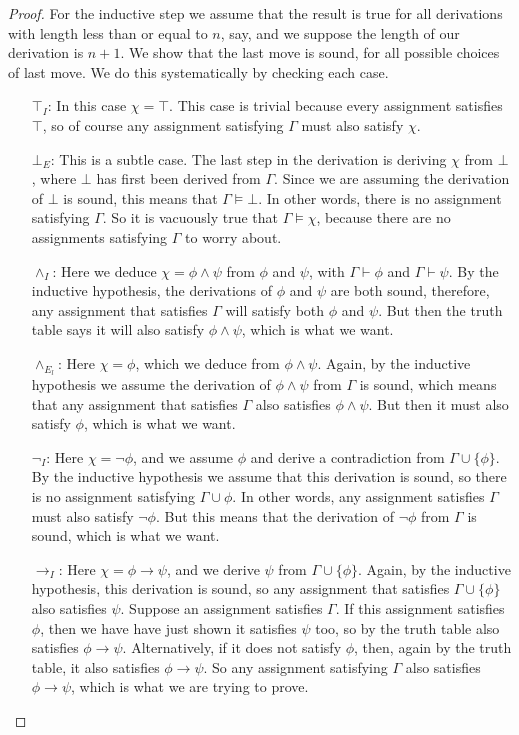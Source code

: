 \documentclass{article}
\theoremstyle{plain}
\begin{document}
\begin{proof}
For the inductive step we assume that the result is true for all derivations with length less than or equal to $n$, say, and we suppose the length of our derivation is $n+1$. We show that the last move is sound, for all possible choices of last move. We do this systematically by checking each case. 
\begin{itemize}
\item[$\top_I$:] In this case $\chi=\top$. This case is trivial because every assignment satisfies $\top$, so of course any assignment satisfying $\Gamma$ must also satisfy $\chi$.
\item[$\bot_E$:] This is a subtle case. The last step in the derivation is deriving $\chi$ from $\bot$, where $\bot$ has first been derived from $\Gamma$. Since we are assuming the derivation of $\bot$ is sound, this means that $\Gamma\models\bot$. In other words, there is no assignment satisfying $\Gamma$. So it is vacuously true that $\Gamma\models \chi$, because there are no assignments satisfying $\Gamma$ to worry about.
\item[$\wedge_I$:] Here we deduce $\chi=\phi\wedge\psi$ from $\phi$ and $\psi$, with $\Gamma\vdash \phi$ and $\Gamma\vdash \psi$. By the inductive hypothesis, the derivations of $\phi$ and $\psi$ are both sound, therefore, any assignment that satisfies $\Gamma$ will satisfy both $\phi$ and $\psi$. But then the truth table says it will also satisfy $\phi\wedge\psi$, which is what we want.
\item[$\wedge_{E_l}$:] Here $\chi=\phi$, which we deduce from $\phi\wedge \psi$. Again, by the inductive hypothesis we assume the derivation of $\phi\wedge \psi$ from $\Gamma$ is sound, which means that any assignment that satisfies $\Gamma$ also satisfies $\phi\wedge \psi$. But then it must also satisfy $\phi$, which is what we want.
\item[$\neg_I$:] Here $\chi=\neg\phi$, and we assume $\phi$ and derive a contradiction from $\Gamma\cup\{\phi\}$. By the inductive hypothesis we assume that this derivation is sound, so there is no assignment satisfying $\Gamma\cup\phi$. In other words, any assignment satisfies $\Gamma$ must also satisfy $\neg\phi$. But this means that the derivation of $\neg\phi$ from $\Gamma$ is sound, which is what we want.
\item[$\rightarrow_I$:]  Here $\chi=\phi\rightarrow \psi$, and we derive $\psi$ from $\Gamma\cup\{\phi\}$. Again, by the inductive hypothesis, this derivation is sound, so any assignment that satisfies $\Gamma\cup\{\phi\}$ also satisfies $\psi$. Suppose an assignment satisfies $\Gamma$. If this assignment satisfies $\phi$, then we have have just shown it satisfies $\psi$ too, so by the truth table also satisfies $\phi\rightarrow \psi$. Alternatively, if it does not satisfy $\phi$, then, again by the truth table, it also satisfies $\phi\rightarrow\psi$. So any assignment satisfying $\Gamma$ also satisfies $\phi\rightarrow\psi$, which is what we are trying to prove.

\end{itemize}
\end{proof}
\end{document}
